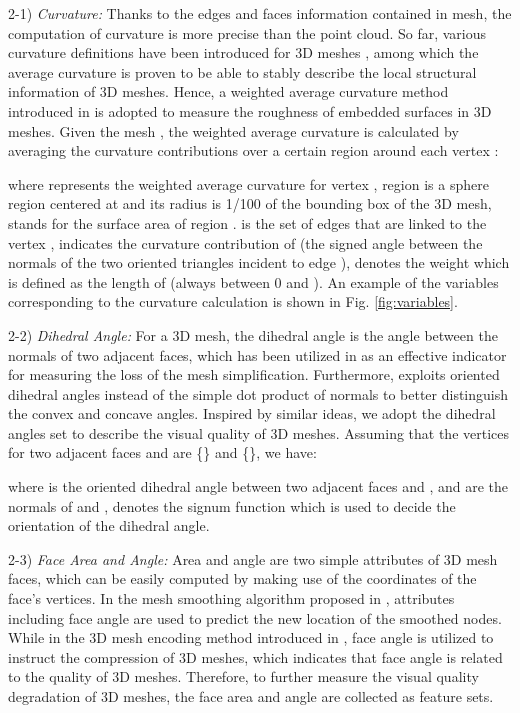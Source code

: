 \documentclass[lettersize,journal]{IEEEtran}
\begin{document}
2-1) \textit{Curvature:}
Thanks to the edges and faces information contained in mesh, the computation of curvature is more precise than the point cloud. So far, various curvature definitions have been introduced for 3D meshes \cite{gaussian_curvature} \cite{average_curvature}, among which the average curvature is proven to be able to stably describe the local structural information of 3D meshes. Hence, a weighted average curvature method introduced in \cite{average_curvature} is adopted to measure the roughness of embedded surfaces in 3D meshes. Given the mesh , the weighted average curvature is calculated by averaging the curvature contributions over a certain region  around each vertex :

where  represents the weighted average curvature for vertex , region  is a sphere region centered at  and its radius is 1/100 of the bounding box of the 3D mesh,  stands for the surface area of region .  is the set of edges that are linked to the vertex ,  indicates the curvature contribution of  (the signed angle between the normals of the two oriented triangles incident to edge ),  denotes the weight which is defined as the length of  (always between 0 and ). An example of the variables corresponding to the curvature calculation is shown in Fig. \ref{fig:variables}.

2-2) \textit{Dihedral Angle:}
For a 3D mesh, the dihedral angle is the angle between the normals of two adjacent faces, which has been utilized in \cite{dihedral2} as an effective indicator for measuring the loss of the mesh simplification. Furthermore, \cite{dame} exploits oriented dihedral angles instead of the simple dot product of normals to better distinguish the convex and concave angles. Inspired by similar ideas, we adopt the dihedral angles set to describe the visual quality of 3D meshes. Assuming that the vertices for two adjacent faces  and  are \{\} and \{\}, we have:

where  is the oriented dihedral angle between two adjacent faces  and ,  and  are the normals of  and ,  denotes the signum function which is used to decide the orientation of the dihedral angle. 

2-3) \textit{Face Area and Angle:}
Area and angle are two simple attributes of 3D mesh faces, which can be easily computed by making use of the coordinates of the face's vertices. In the mesh smoothing algorithm proposed in \cite{angle1}, attributes including face angle are used to predict the new location of the smoothed nodes. While in the 3D mesh encoding method introduced in \cite{angle2}, face angle is utilized to instruct the compression of 3D meshes, which indicates that face angle is related to the quality of 3D meshes. Therefore, to further measure the visual quality degradation of 3D meshes, the face area and angle are collected as feature sets. 
\end{document}
